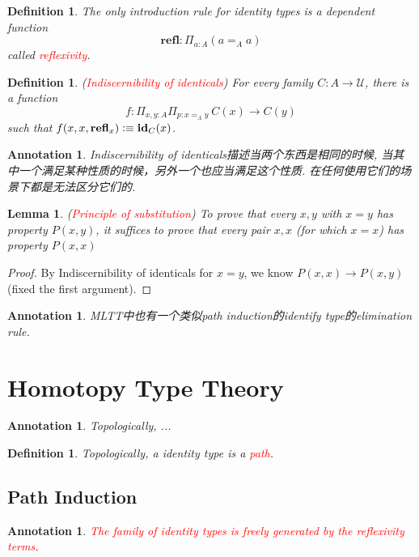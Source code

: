 \documentclass{article}
\newtheorem{lemma}[theorem]{Lemma}
\newtheorem{definition}[theorem]{Definition}
\newtheorem{annotation}[theorem]{Annotation}
\newcommand{\redt}[1]{\textcolor{red}{#1}}
\newcommand{\defeqv}{\vcentcolon\equiv}
\newcommand{\refl}{\textbf{refl}}
\newcommand{\id}{\textbf{id}}
\begin{document}
\begin{definition}
\rm The only introduction rule for identity types is a dependent function
\[
    \refl : \Pi_{a : A} (a =_A a)
\]
called \redt{reflexivity}.
\end{definition}

\begin{definition}
\rm (\redt{Indiscernibility of identicals}) For every family $C : A \to \mathcal{U}$, there is a function
\[
    f: \Pi_{x,y : A} \Pi_{p : x =_A y} ~C(x) \to C(y)
\]
such that $f(x,x,\refl_x) \defeqv \id_C(x)$.
\end{definition}

\begin{annotation}
\rm Indiscernibility of identicals描述当两个东西是相同的时候, 当其中一个满足某种性质的时候，另外一个也应当满足这个性质. 在任何使用它们的场景下都是无法区分它们的.
\end{annotation}

\begin{lemma}
\rm (\redt{Principle of substitution}) To prove that every $x,y$ with $x = y$ has property $P(x,y)$, it suffices to prove that every pair $x,x$ (for which $x = x$) has property $P(x,x)$
\end{lemma}

\begin{proof}
By Indiscernibility of identicals for $x = y$, we know $P(x,x) \to P(x,y)$ (fixed the first argument).
\end{proof}

\begin{annotation}
\rm MLTT中也有一个类似path induction的identify type的elimination rule.
\end{annotation}

\newpage
\section{Homotopy Type Theory}
\begin{annotation}
Topologically, ...
\end{annotation}

\begin{definition}
\rm Topologically, a identity type is a \redt{path}.  
\end{definition}

\subsection{Path Induction}
\begin{annotation}
\rm \redt{The family of identity types is freely generated by the reflexivity terms}.
\end{annotation}
\end{document}

